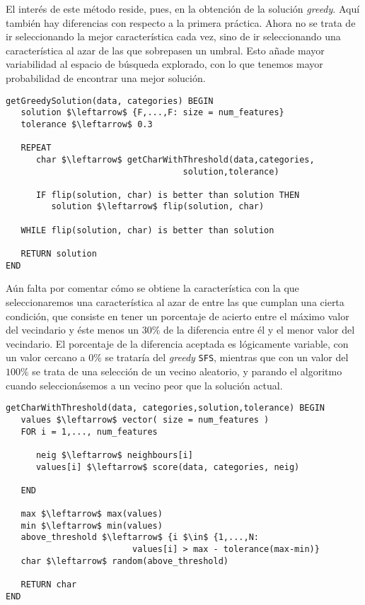 \documentclass[11pt,leqno]{article}
\begin{document}
	El interés de este método reside, pues, en la obtención de la solución \textit{greedy}. Aquí también hay diferencias con respecto a la primera práctica. Ahora no se trata de ir seleccionando la mejor característica cada vez, sino de ir seleccionando una característica al azar de las que sobrepasen un umbral. Esto añade mayor variabilidad al espacio de búsqueda explorado, con lo que tenemos mayor probabilidad de encontrar una mejor solución. 
	
	
	\begin{lstlisting}[mathescape=true]
getGreedySolution(data, categories) BEGIN
   solution $\leftarrow$ {F,...,F: size = num_features}
   tolerance $\leftarrow$ 0.3
   
   REPEAT
      char $\leftarrow$ getCharWithThreshold(data,categories,
                                   solution,tolerance)
      
      IF flip(solution, char) is better than solution THEN
         solution $\leftarrow$ flip(solution, char)
   
   WHILE flip(solution, char) is better than solution
   
   RETURN solution
END
	\end{lstlisting}
	
	Aún falta por comentar cómo se obtiene la característica con la que seleccionaremos una característica al azar de entre las que cumplan una cierta condición, que consiste en tener un porcentaje de acierto entre el máximo valor del vecindario y éste menos un $30\%$ de la diferencia entre él y el menor valor del vecindario. El porcentaje de la diferencia aceptada es lógicamente variable, con un valor cercano a $0\%$ se trataría del \textit{greedy} \texttt{SFS}, mientras que con un valor del $100\%$ se trata de una selección de un vecino aleatorio, y parando el algoritmo cuando seleccionásemos a un vecino peor que la solución actual.
	
	\begin{lstlisting}[mathescape=true]
getCharWithThreshold(data, categories,solution,tolerance) BEGIN
   values $\leftarrow$ vector( size = num_features )
   FOR i = 1,..., num_features
      
      neig $\leftarrow$ neighbours[i]
      values[i] $\leftarrow$ score(data, categories, neig)
   
   END
   
   max $\leftarrow$ max(values)
   min $\leftarrow$ min(values)   
   above_threshold $\leftarrow$ {i $\in$ {1,...,N: 
                         values[i] > max - tolerance(max-min)}
   char $\leftarrow$ random(above_threshold)
   
   RETURN char 
END
	\end{lstlisting}
	
\end{document}
